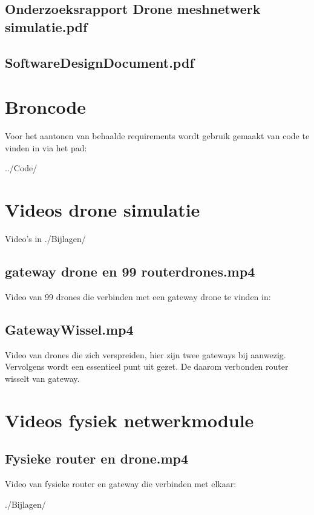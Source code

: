 \documentclass[a4paper, 11pt, oneside]{report}
\begin{document}
\section[Onderzoeksrapport Drone meshnetwerk simulatie]{Onderzoeksrapport Drone meshnetwerk simulatie.pdf}\label{sec:onderzoeksrapport-drone-meshnetwerk-simulatie}
\section[Softwaredesign document]{SoftwareDesignDocument.pdf}\label{sec:softwaredesigndocument}


\chapter{Broncode}
\label{app:broncode}
Voor het aantonen van behaalde requirements wordt gebruik gemaakt van code te vinden in via het pad:

../Code/

\chapter{Videos drone simulatie}\label{sec:videos-drone-simulatie}
Video's in ./Bijlagen/
\section{gateway drone en 99 routerdrones.mp4}\label{sec:gateway-drone-en-99-routerdronesmp4}
Video van 99 drones die verbinden met een gateway drone te vinden in:
\section{GatewayWissel.mp4}\label{sec:gatewaywisselmp4}
Video van drones die zich verspreiden, hier zijn twee gateways bij aanwezig.
Vervolgens wordt een essentieel punt uit gezet. 
De daarom verbonden router wisselt van gateway. 

\chapter{Videos fysiek netwerkmodule}
\section{Fysieke router en drone.mp4}\label{sec:fysieke-router-en-dronemp4}
Video van fysieke router en gateway die verbinden met elkaar:

./Bijlagen/
\end{document}
